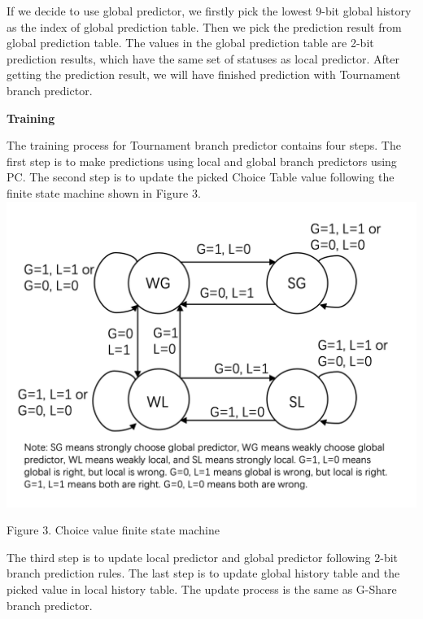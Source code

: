 \documentclass[conference]{IEEEtran}
\begin{document}
If we decide to use global predictor, we firstly pick the lowest 9-bit global history as the index of global prediction table. Then we pick the prediction result from global prediction table. 
The values in the global prediction table are 2-bit prediction results, which have the same set of statuses as local predictor. After getting the prediction result, we will have finished prediction with Tournament branch predictor. 

\begin{center}
  \textbf{Training}
\end{center}
The training process for Tournament branch predictor contains four steps. The first step is to make predictions using local and global branch predictors using PC. The second step is to update the picked Choice Table value following the finite state machine shown in Figure 3.
\includegraphics[width=\linewidth]{choice-machine.png}
\begin{center}
  {\small Figure 3. Choice value finite state machine}
\end{center}
The third step is to update local predictor and global predictor following 2-bit branch prediction rules. The last step is to update global history table and the picked value in local history table. The 
update process is the same as G-Share branch predictor. 
\end{document}
